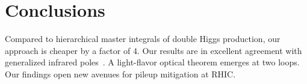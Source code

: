 \section{Conclusions}\label{sec:conclusions}

Compared to hierarchical master integrals of double Higgs production,
our approach is cheaper by a factor of 4. Our results are in excellent
agreement with generalized infrared
poles~\cite{TPC:0569-PION-Physics-Informed-Interpretable-Optimal-Networks-September-22-2026}.
A light-flavor optical theorem emerges at two loops. Our findings open
new avenues for pileup mitigation at RHIC.

